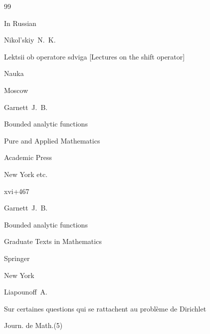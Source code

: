 \begin{thebibliography}{99}





\lang In Russian

\by Nikol'skiy~N.~K.

\book Lektsii ob operatore sdviga \rm [Lectures on the shift operator]


\publ Nauka

\publaddr Moscow




\by Garnett~J.~B.

\book Bounded analytic functions

\serial Pure and Applied Mathematics



\publ Academic Press

\publaddr New York etc.

\totalpages xvi+467




\moreref

\by Garnett~J.~B.

\book Bounded analytic functions

\serial Graduate Texts in Mathematics



\publ Springer

\publaddr New York







\by Liapounoff~A.

\paper Sur certaines questions qui se rattachent au probl\`eme de Dirichlet

\jour Journ. de Math.\rm (5)


\end{thebibliography}
